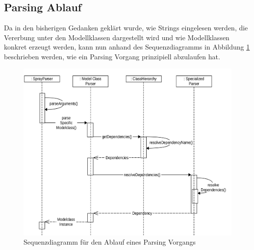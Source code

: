 \subsection{Parsing Ablauf}
Da in den bisherigen Gedanken geklärt wurde, wie Strings eingelesen werden, die Vererbung unter den Modellklassen dargestellt wird und wie Modellklassen konkret erzeugt werden, kann nun anhand des Sequenzdiagramms in Abbildung \ref{sequenzdiagrammAnsatz} beschrieben werden, wie ein Parsing Vorgang prinzipiell abzulaufen hat.\linebreak
\begin{figure}[htb]
	\hspace*{-0.5cm}
		\includegraphics[scale = 0.13]{Bilder/sequenzdiagrammAnsatzKomprimiertScaled(2500x2500).png}
		\caption{Sequenzdiagramm für den Ablauf eines Parsing Vorgangs}
		\label{sequenzdiagrammAnsatz}

\end{figure}
